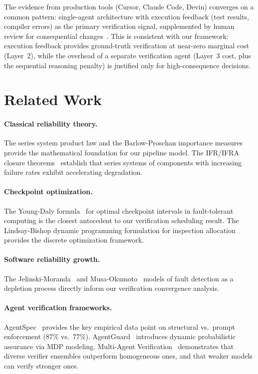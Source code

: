 \documentclass[11pt, a4paper, logo, copyright]{googledeepmind}
\begin{document}
The evidence from production tools (Cursor, Claude Code, Devin) converges on a common pattern: single-agent architecture with execution feedback (test results, compiler errors) as the primary verification signal, supplemented by human review for consequential changes~\citep{cognition2025devin, metr2025devproductivity}.
This is consistent with our framework: execution feedback provides ground-truth verification at near-zero marginal cost (Layer~2), while the overhead of a separate verification agent (Layer~3 cost, plus the sequential reasoning penalty) is justified only for high-consequence decisions.

\section{Related Work}
\label{sec:related}

\paragraph{Classical reliability theory.}
The series system product law and the Barlow-Proschan importance measures~\citep{barlow1965mathematical, barlow1975statistical} provide the mathematical foundation for our pipeline model.
The IFR/IFRA closure theorems~\citep{birnbaum1961stochastic} establish that series systems of components with increasing failure rates exhibit accelerating degradation.

\paragraph{Checkpoint optimization.}
The Young-Daly formula~\citep{young1974first, daly2006higher} for optimal checkpoint intervals in fault-tolerant computing is the closest antecedent to our verification scheduling result.
The Lindsay-Bishop dynamic programming formulation for inspection allocation~\citep{lindsay1964allocation} provides the discrete optimization framework.

\paragraph{Software reliability growth.}
The Jelinski-Moranda~\citep{jelinski1972software} and Musa-Okumoto~\citep{musa1984logarithmic} models of fault detection as a depletion process directly inform our verification convergence analysis.

\paragraph{Agent verification frameworks.}
AgentSpec~\citep{wang2026agentspec} provides the key empirical data point on structural vs.\ prompt enforcement (87\% vs.\ 77\%).
AgentGuard~\citep{koohestani2025agentguard} introduces dynamic probabilistic assurance via MDP modeling.
Multi-Agent Verification~\citep{lifshitz2025mav} demonstrates that diverse verifier ensembles outperform homogeneous ones, and that weaker models can verify stronger ones.
\end{document}
